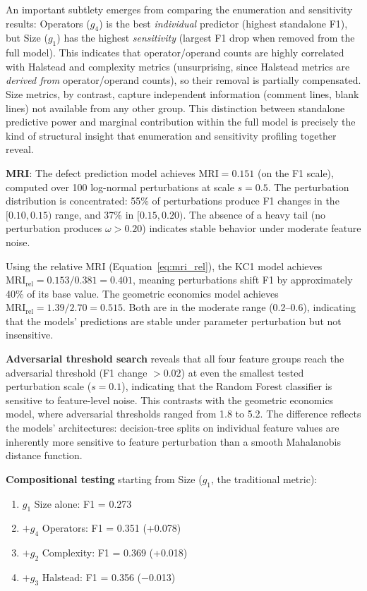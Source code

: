 \documentclass[manuscript,review,anonymous]{acmart}
\newcommand{\MRI}{\mathrm{MRI}}
\begin{document}
An important subtlety emerges from comparing the enumeration and sensitivity results: Operators ($g_4$) is the best \emph{individual} predictor (highest standalone F1), but Size ($g_1$) has the highest \emph{sensitivity} (largest F1 drop when removed from the full model).
This indicates that operator/operand counts are highly correlated with Halstead and complexity metrics (unsurprising, since Halstead metrics are \emph{derived from} operator/operand counts), so their removal is partially compensated.
Size metrics, by contrast, capture independent information (comment lines, blank lines) not available from any other group.
This distinction between standalone predictive power and marginal contribution within the full model is precisely the kind of structural insight that enumeration and sensitivity profiling together reveal.

\textbf{MRI}: The defect prediction model achieves $\MRI = 0.151$ (on the F1 scale), computed over 100 log-normal perturbations at scale $s = 0.5$.
The perturbation distribution is concentrated: 55\% of perturbations produce F1 changes in the $[0.10, 0.15)$ range, and 37\% in $[0.15, 0.20)$.
The absence of a heavy tail (no perturbation produces $\omega > 0.20$) indicates stable behavior under moderate feature noise.

Using the relative MRI (Equation~\ref{eq:mri_rel}), the KC1 model achieves $\MRI_{\mathrm{rel}} = 0.153 / 0.381 = 0.401$, meaning perturbations shift F1 by approximately 40\% of its base value.
The geometric economics model achieves $\MRI_{\mathrm{rel}} = 1.39 / 2.70 = 0.515$.
Both are in the moderate range (0.2--0.6), indicating that the models' predictions are stable under parameter perturbation but not insensitive.

\textbf{Adversarial threshold search} reveals that all four feature groups reach the adversarial threshold (F1 change $> 0.02$) at even the smallest tested perturbation scale ($s = 0.1$), indicating that the Random Forest classifier is sensitive to feature-level noise.
This contrasts with the geometric economics model, where adversarial thresholds ranged from 1.8 to 5.2.
The difference reflects the models' architectures: decision-tree splits on individual feature values are inherently more sensitive to feature perturbation than a smooth Mahalanobis distance function.

\textbf{Compositional testing} starting from Size ($g_1$, the traditional metric):

\begin{enumerate}
    \item $g_1$ Size alone: F1 = 0.273
    \item $+ g_4$ Operators: F1 = 0.351 (+0.078)
    \item $+ g_2$ Complexity: F1 = 0.369 (+0.018)
    \item $+ g_3$ Halstead: F1 = 0.356 ($-$0.013)
\end{enumerate}
\end{document}
